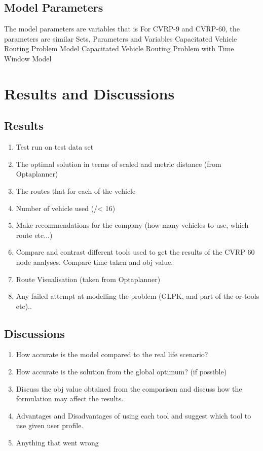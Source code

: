 \documentclass[a4paper, 12pt]{report}
\begin{document}
\section{Model Parameters}
The model parameters are variables that is For CVRP-9 and CVRP-60, the parameters are similar
Sets, Parameters and Variables
Capacitated Vehicle Routing Problem Model
Capacitated Vehicle Routing Problem with Time Window Model

\chapter{Results and Discussions}
\section{Results}
\begin{enumerate}
\item Test run on test data set
\item The optimal solution in terms of scaled and metric distance (from Optaplanner)
\item The routes that for each of the vehicle
\item Number of vehicle used (/< 16)
\item Make recommendations for the company (how many vehicles to use, which route etc...)
\item Compare and contrast different tools used to get the results of the CVRP 60 node analyses. Compare time taken and obj value.
\item Route Visualisation (taken from Optaplanner)
\item Any failed attempt at modelling the problem (GLPK, and part of the or-tools etc)..
\end{enumerate}

\section{Discussions}
\begin{enumerate}
\item How accurate is the model compared to the real life scenario?
\item How accurate is the solution from the global optimum? (if possible)
\item Discuss the obj value obtained from the comparison and discuss how the formulation may affect the results.
\item Advantages and Disadvantages of using each tool and suggest which tool to use given user profile.
\item Anything that went wrong
\end{enumerate}
\end{document}
